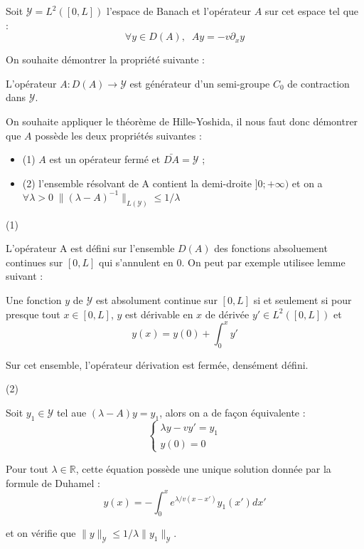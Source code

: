 \documentclass[a4paper]{article}
\begin{document}
Soit $\mathscr{Y} = L^2([0,L])$ l'espace de Banach et l'opérateur $A$ sur cet espace tel que :
\[ \forall y \in D(A), \; \; Ay = -v \partial_x y \]

On souhaite démontrer la propriété suivante :

\begin{proposition}
	L'opérateur $A: D(A) \to \mathscr{Y}$ est générateur d'un semi-groupe $C_0$ de contraction dans $\mathscr{Y}$.
\end{proposition}

\begin{preuve}
	On souhaite appliquer le théorème de Hille-Yoshida, 
	il nous faut donc démontrer que $A$ possède les deux propriétés suivantes :
\begin{itemize}
	\item (1) $A$ est un opérateur fermé et $\bar{D{A}} = \mathscr{Y}$ ;
	\item (2) l'ensemble résolvant de A contient la demi-droite $]0; + \infty)$ et on a 
	$\forall \lambda > 0 \; \| (\lambda - A)^{-1} \|_{L({\mathscr{Y}})} \leq 1/\lambda $
\end{itemize}

(1)

L'opérateur A est défini sur l'ensemble $D(A)$ des fonctions absoluement continues sur $[0,L]$ qui s'annulent en $0$. 
On peut par exemple utilisee lemme suivant :

\begin{lemme}
	Une fonction $y$ de $\mathscr{Y}$ est absolument continue sur $[0,L]$ si et seulement si pour presque tout $x \in [0,L]$, 
	$y$ est dérivable en $x$ de dérivée $y' \in L^2([0,L])$ et 
	\[ y(x) = y(0) + \int_0^x y' \]
\end{lemme}

Sur cet ensemble, l'opérateur dérivation est fermée, densément défini.

(2)

Soit $y_1 \in \mathscr{Y}$ tel aue $(\lambda -A)y = y_1$, alors on a de façon équivalente :
\[ \begin{cases}
\lambda y - v y' = y_1 \\
y(0) = 0
\end{cases}\]

Pour tout $\lambda \in \mathbb{R}$, cette équation possède une unique solution donnée par la formule de Duhamel :
\[ y(x) = - \int_0^x e^{\lambda/v (x-x')}y_1(x')dx' \]

et on vérifie que $ \| y \|_{\mathscr{Y}} \leq 1/ \lambda \|y_1 \|_{\mathscr{Y}}$.


\end{preuve}
\end{document}
